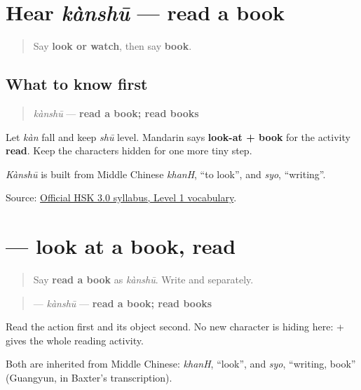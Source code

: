 \section[kànshū]{Hear \emph{kànshū} — read a book}

\label{lesson:ZH-C18-hear-kanshu}



\begin{quote}
Say \textbf{look or watch}, then say \textbf{book}.
\end{quote}

\subsection*{What to know first}
\begin{quote}
\emph{kànshū} — \textbf{read a book; read books}
\end{quote}

Let \emph{kàn} fall and keep \emph{shū} level. Mandarin says \textbf{look-at + book} for the activity \textbf{read}. Keep the characters hidden for one more tiny step.

\emph{Kànshū} is built from Middle Chinese \emph{khanH}, \textquotedblleft{}to look\textquotedblright{}, and \emph{syo}, \textquotedblleft{}writing\textquotedblright{}.

\begin{tcolorbox}[breakable,colback=teal!4,colframe=teal!35!black,title={Before you move on}]
Source: \href{https://hsk.cn-bj.ufileos.com/3.0/\%E6\%96\%B0\%E7\%89\%88HSK\%E8\%80\%83\%E8\%AF\%95\%E5\%A4\%A7\%E7\%BA\%B21219.pdf}{Official HSK 3.0 syllabus, Level 1 vocabulary}.
\end{tcolorbox}
\section[\texorpdfstring{\zh{看书} (kànshū)}{看书 (kànshū)}]{ — look at a book, read}

\label{lesson:ZH-C18-kanshu}



\begin{quote}
Say \textbf{read a book} as \emph{kànshū}. Write  and  separately.
\end{quote}

\begin{cousinweb}
\begin{quote}
\textbf{} — \emph{kànshū} — \textbf{read a book; read books}
\end{quote}

Read the action first and its object second. No new character is hiding here:  +  gives the whole reading activity.

Both are inherited from Middle Chinese: \emph{khanH}, \textquotedblleft{}look\textquotedblright{}, and \emph{syo}, \textquotedblleft{}writing, book\textquotedblright{} (Guangyun, in Baxter's transcription).
\end{cousinweb}

